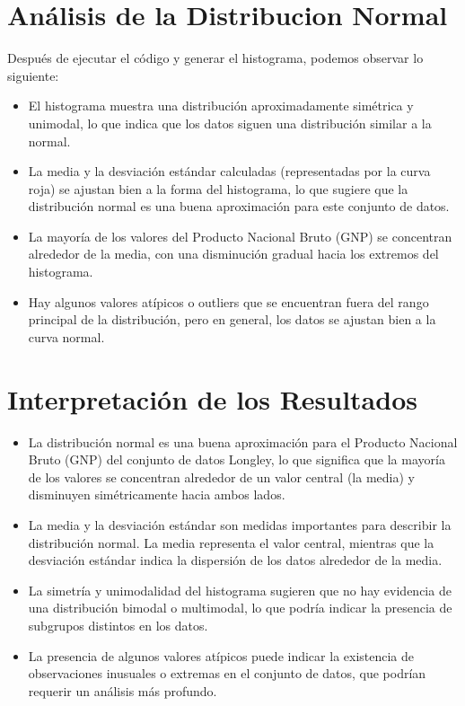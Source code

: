 \documentclass{article}
\begin{document}
\section{Análisis de la Distribucion Normal} Después de ejecutar el código y generar el histograma, podemos observar lo siguiente: \begin{itemize}
    \item El histograma muestra una distribución aproximadamente simétrica y unimodal, lo que indica que los datos siguen una distribución similar a la normal.
    \item La media y la desviación estándar calculadas (representadas por la curva roja) se ajustan bien a la forma del histograma, lo que sugiere que la distribución normal es una buena aproximación para este conjunto de datos.
    \item La mayoría de los valores del Producto Nacional Bruto (GNP) se concentran alrededor de la media, con una disminución gradual hacia los extremos del histograma.
    \item Hay algunos valores atípicos o outliers que se encuentran fuera del rango principal de la distribución, pero en general, los datos se ajustan bien a la curva normal.
    \end{itemize} \section{Interpretación de los Resultados} \begin{itemize}
    \item La distribución normal es una buena aproximación para el Producto Nacional Bruto (GNP) del conjunto de datos Longley, lo que significa que la mayoría de los valores se concentran alrededor de un valor central (la media) y disminuyen simétricamente hacia ambos lados.
    \item La media y la desviación estándar son medidas importantes para describir la distribución normal. La media representa el valor central, mientras que la desviación estándar indica la dispersión de los datos alrededor de la media.
    \item La simetría y unimodalidad del histograma sugieren que no hay evidencia de una distribución bimodal o multimodal, lo que podría indicar la presencia de subgrupos distintos en los datos.
    \item La presencia de algunos valores atípicos puede indicar la existencia de observaciones inusuales o extremas en el conjunto de datos, que podrían requerir un análisis más profundo.
    \end{itemize}
\end{document}
